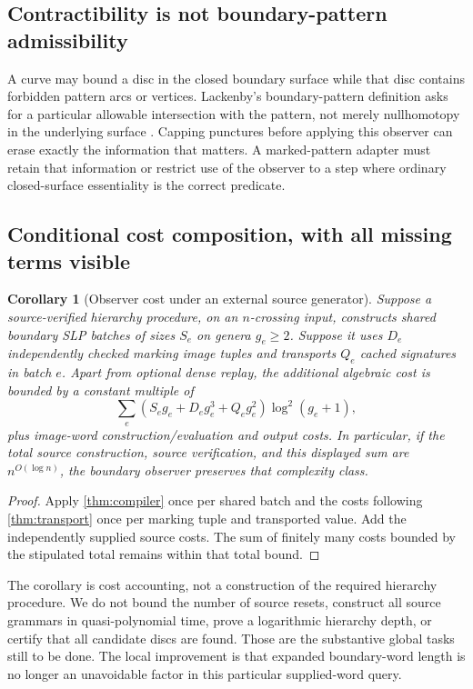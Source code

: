 \documentclass[11pt,letterpaper]{article}
\newtheorem{corollary}[corollary]{Corollary}
\theoremstyle{definition}
\theoremstyle{remark}
\begin{document}
\subsection{Contractibility is not boundary-pattern admissibility}
A curve may bound a disc in the closed boundary surface while that disc contains forbidden pattern arcs or vertices. Lackenby's boundary-pattern definition asks for a particular allowable intersection with the pattern, not merely nullhomotopy in the underlying surface \cite{lackenby}. Capping punctures before applying this observer can erase exactly the information that matters. A marked-pattern adapter must retain that information or restrict use of the observer to a step where ordinary closed-surface essentiality is the correct predicate.

\subsection{Conditional cost composition, with all missing terms visible}
\begin{corollary}[Observer cost under an external source generator]\label{cor:global}
Suppose a source-verified hierarchy procedure, on an $n$-crossing input, constructs shared boundary SLP batches of sizes $S_e$ on genera $g_e\ge2$. Suppose it uses $D_e$ independently checked marking image tuples and transports $Q_e$ cached signatures in batch $e$. Apart from optional dense replay, the additional algebraic cost is bounded by a constant multiple of
\[
 \sum_e\left(S_e g_e+D_e g_e^3+Q_e g_e^2\right)
            \log^2(g_e+1),
\]
plus image-word construction/evaluation and output costs. In particular, if the total source construction, source verification, and this displayed sum are $n^{O(\log n)}$, the boundary observer preserves that complexity class.
\end{corollary}
\begin{proof}
Apply \cref{thm:compiler} once per shared batch and the costs following \cref{thm:transport} once per marking tuple and transported value. Add the independently supplied source costs. The sum of finitely many costs bounded by the stipulated total remains within that total bound.
\end{proof}
The corollary is cost accounting, not a construction of the required hierarchy procedure. We do not bound the number of source resets, construct all source grammars in quasi-polynomial time, prove a logarithmic hierarchy depth, or certify that all candidate discs are found. Those are the substantive global tasks still to be done. The local improvement is that expanded boundary-word length is no longer an unavoidable factor in this particular supplied-word query.
\end{document}
